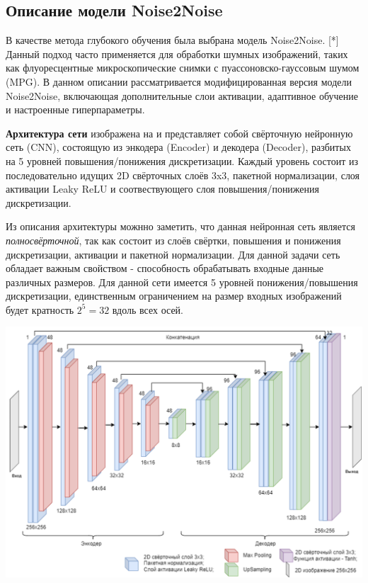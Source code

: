 \subsection{Описание модели Noise2Noise}
\par В качестве метода глубокого обучения была выбрана модель Noise2Noise. [*] Данный подход часто применяется для обработки шумных изображений, таких как флуоресцентные микроскопические снимки с пуассоновско-гауссовым шумом (MPG). В данном описании рассматривается модифицированная версия модели Noise2Noise, включающая дополнительные слои активации, адаптивное обучение и настроенные гиперпараметры. 
\par \textbf{Архитектура сети} изображена на  и представляет собой свёрточную нейронную сеть (CNN), состоящую из энкодера (Encoder) и декодера (Decoder), разбитых на 5 уровней повышения/понижения дискретизации. Каждый уровень состоит из последовательно идущих 2D свёрточных слоёв 3x3, пакетной нормализации, слоя активации Leaky ReLU и соотвествующего слоя повышения/понижения дискретизации.
\par Из описания архитектуры можнно заметить, что данная нейронная сеть является \textit{полносвёрточной}, так как состоит из слоёв свёртки, повышения и понижения дискретизации, активации и пакетной нормализации. Для данной задачи сеть обладает важным свойством - способность обрабатывать входные данные различных размеров. Для данной сети имеется 5 уровней понижения/повышения дискретизации, единственным ограничением на размер входных изображений будет кратность $2^5 = 32$ вдоль всех осей.
\begin{minipage}{\textwidth}
	\centering
	\vspace{\mfloatsep} %
	\includegraphics[keepaspectratio=true,scale=0.47] {my_folder/images/denoising/n2n_architecture.png}
	\label{fig:noise2noise}  
	\vspace{\mfloatsep} %
\end{minipage}

